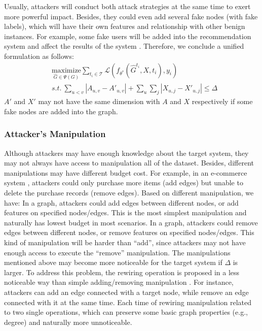 Usually, attackers will conduct both attack strategies at the same time to exert more powerful impact. Besides, they could even add several fake nodes (with fake labels), which will have their own features and relationship with other benign instances. For example, some fake users will be added into the recommendation system and affect the results of the system \cite{chen2019data,hou2019alphacyber}. Therefore, we conclude a unified formulation as follows:
\begin{equation}
	\begin{aligned}
		 & \underset{\hat{G} \in \Psi(G)} {\text{maximize}} \sum_{t_i \in \mathcal{T}} \mathcal{L}(f_{\theta^*}(\hat{G}^{t_i},X,t_i),y_i) \\
		 & s.t. \  \sum_{u<v} |A_{u,v}-A'_{u,v} | + \sum_u \sum_j  |X_{u,j}-X'_{u,j} |\leq \Delta
	\end{aligned}
\end{equation}
$A'$ and $X'$ may not have the same dimension with $A$ and $X$ respectively if some fake nodes are added into the graph.

\subsubsection{Attacker’s Manipulation}
Although attackers may have enough knowledge about the target system, they may not always have access to manipulation all of the dataset. Besides, different manipulations may have different budget cost. For example, in an e-commerce system \cite{DBLP:conf/ijcai/ChenL0GZ19}, attackers could only purchase more items (add edges) but unable to delete the purchase records (remove edges). Based on different manipulation, we have:
In a graph, attackers could add edges between different nodes, or add features on specified nodes/edges. This is the most simplest manipulation and naturally has lowest budget in most scenarios.
In a graph, attackers could remove edges between different nodes, or remove features on specified nodes/edges. This kind of manipulation will be harder than ``add'', since attackers may not have enough access to execute the ``remove'' manipulation.
The manipulations mentioned above may become more noticeable for the target system if $\Delta$ is larger. To address this problem, the rewiring operation is proposed in a less noticeable way than simple adding/removing manipulation \cite{ma2019attacking, waniek2018attack}. For instance, attackers can add an edge connected with a target node, while remove an edge connected with it at the same time. Each time of rewiring manipulation related to two single operations, which can preserve some basic graph properties (e.g., degree) and naturally more unnoticeable.

